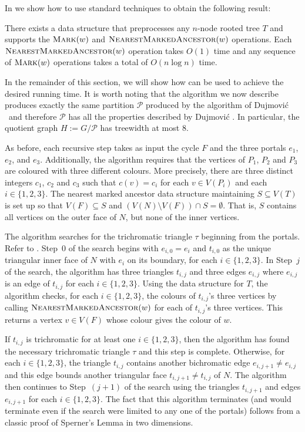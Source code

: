 \documentclass[kpfonts]{patmorin}
\begin{document}
In  we show how to use standard techniques to obtain the following result:

\begin{lem}
    There exists a data structure that preprocesses any $n$-node rooted tree $T$ and supports the $\textsc{Mark}(w)$ and $\textsc{NearestMarkedAncestor}(w)$ operations. Each $\textsc{NearestMarkedAncestor}(w)$ operation takes $O(1)$ time and any sequence of $\textsc{Mark}(w)$ operations takes a total of $O(n\log n)$ time.
\end{lem}

In the remainder of this section, we will show how  can be used to achieve the desired running time.  It is worth noting that the algorithm we now describe produces exactly the same partition $\mathcal{P}$ produced by the algorithm of Dujmović \etal\ and therefore $\mathcal{P}$ has all the properties described by Dujmović \etal.  In particular, the quotient graph $H:=G/\mathcal{P}$ has treewidth at most $8$.

As before, each recursive step takes as input the cycle $F$ and the three portals $e_1$, $e_2$, and $e_3$.  Additionally, the algorithm requires that the vertices of $P_1$, $P_2$ and $P_3$ are coloured with three different colours.  More precisely, there are three distinct integers $c_1$, $c_2$ and $c_3$ such that $c(v)=c_i$ for each $v\in V(P_i)$ and each $i\in\{1,2,3\}$.  The nearest marked ancestor data structure maintaining $S\subseteq V(T)$ is set up so that $V(F)\subseteq S$ and $(V(N)\setminus V(F))\cap S=\emptyset$.  That is, $S$ contains all vertices on the outer face of $N$, but none of the inner vertices.

The algorithm searches for the trichromatic triangle $\tau$ beginning from the portals.  Refer to . Step~0 of the search begins with $e_{i,0}=e_i$ and $t_{i,0}$ as the unique triangular inner face of $N$ with $e_i$ on its boundary, for each $i\in\{1,2,3\}$. In Step~$j$ of the search, the algorithm has three triangles $t_{i,j}$ and three edges $e_{i,j}$ where $e_{i,j}$ is an edge of $t_{i,j}$ for each $i\in\{1,2,3\}$.  Using the data structure for $T$, the algorithm checks, for each $i\in\{1,2,3\}$, the colours of $t_{i,j}$'s three vertices by calling $\textsc{NearestMarkedAncestor}(w)$ for each of $t_{i,j}$'s three vertices.  This returns a vertex $v\in V(F)$ whose colour gives the colour of $w$.

If $t_{i,j}$ is trichromatic for at least one $i\in\{1,2,3\}$, then the algorithm has found the necessary trichromatic triangle $\tau$ and this step is complete. Otherwise, for each $i\in\{1,2,3\}$, the triangle $t_{i,j}$ contains another bichromatic edge $e_{i,j+1}\neq e_{i,j}$ and this edge bounds another triangular face $t_{i,j+1}\neq t_{i,j}$ of $N$.  The algorithm then continues to Step~$(j+1)$ of the search using the triangles $t_{i,j+1}$ and edges $e_{i,j+1}$ for each $i\in\{1,2,3\}$.  The fact that this algorithm terminates (and would terminate even if the search were limited to any one of the portals) follows from a classic proof of Sperner's Lemma in two dimensions.
\end{document}
